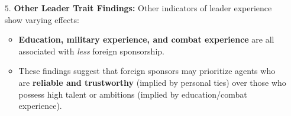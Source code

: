 \documentclass{article}
\begin{document}
\begin{itemize}
        \item[$5$.] \textbf{Other Leader Trait Findings:} Other indicators
        of leader experience show varying effects:
        \begin{itemize}
            \item
            \textbf{Education, military experience, and combat experience}
            are all associated with \textit{less} foreign sponsorship.
            \item These findings suggest that foreign sponsors may
            prioritize agents who are
            \textbf{reliable and trustworthy} (implied by personal ties)
            over those who possess high talent or ambitions (implied by
            education/combat experience).
        \end{itemize}
    \end{itemize}

    
\end{document}
